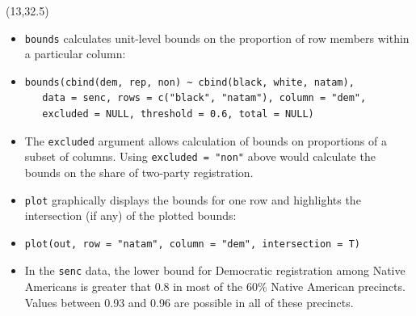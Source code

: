\documentclass{article}
\def\CHead#1{\bigskip\begin{center}\noindent{\Large\color{DarkBlue} #1}\end{center}}
\renewcommand{\small}{\fontsize{24.88}{30}\selectfont}
\renewcommand{\Large}{\fontsize{51.6}{64}\selectfont}
\begin{document}
\begin{textblock}{12}(13,32.5)

\CHead{Method of bounds}
\begin{itemize}
\item \texttt{bounds} calculates unit-level bounds on the proportion
of row members within a particular column: 
\item[] {\small\begin{verbatim}
bounds(cbind(dem, rep, non) ~ cbind(black, white, natam), 
   data = senc, rows = c("black", "natam"), column = "dem", 
   excluded = NULL, threshold = 0.6, total = NULL)
\end{verbatim}}
\item[] The \texttt{excluded} argument allows calculation of bounds on
proportions of a subset of columns.  Using \texttt{excluded = "non"}
above would calculate the bounds on the share of two-party
registration.
\item \texttt{plot} graphically displays the bounds for one row and
highlights the intersection (if any) of the plotted bounds:
\item[] {\small\begin{verbatim}
plot(out, row = "natam", column = "dem", intersection = T)
\end{verbatim}}
\item In the \texttt{senc} data, the lower bound for Democratic
registration among Native Americans is greater that 0.8 in most of the
60\% Native American precincts.  Values between 0.93 and 0.96 are
possible in all of these precincts.
\end{itemize}
\begin{center}

\end{center}
\end{textblock}
\end{document}
